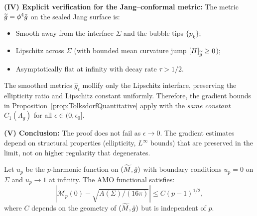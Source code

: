 \begin{remark}
\textbf{(IV) Explicit verification for the Jang--conformal metric:} The metric $\widetilde{g} = \phi^4\bar{g}$ on the sealed Jang surface is:
\begin{itemize}
    \item Smooth away from the interface $\Sigma$ and the bubble tips $\{p_k\}$;
    \item Lipschitz across $\Sigma$ (with bounded mean curvature jump $[H]_{\widetilde{g}} \ge 0$);
    \item Asymptotically flat at infinity with decay rate $\tau > 1/2$.
\end{itemize}
The smoothed metrics $\hat{g}_\epsilon$ mollify only the Lipschitz interface, preserving the ellipticity ratio and Lipschitz constant uniformly. Therefore, the gradient bounds in Proposition~\ref{prop:TolksdorfQuantitative} apply with the \emph{same constant $C_1(\Lambda_g)$} for all $\epsilon \in (0, \epsilon_0]$.

\textbf{(V) Conclusion:} The proof does not fail as $\epsilon \to 0$. The gradient estimates depend on structural properties (ellipticity, $L^\infty$ bounds) that are preserved in the limit, not on higher regularity that degenerates.
\end{remark}

\begin{lemma}\label{lem:pConvergenceRate}
Let $u_p$ be the $p$-harmonic function on $(\widetilde{M}, \hat{g})$ with boundary conditions $u_p = 0$ on $\Sigma$ and $u_p \to 1$ at infinity. The AMO functional satisfies:
\begin{equation}\label{eq:pConvergenceRate}
    |\mathcal{M}_p(0) - \sqrt{A(\Sigma)/(16\pi)}| \le C (p-1)^{1/2},
\end{equation}
where $C$ depends on the geometry of $(\widetilde{M}, \hat{g})$ but is independent of $p$.
\end{lemma}

